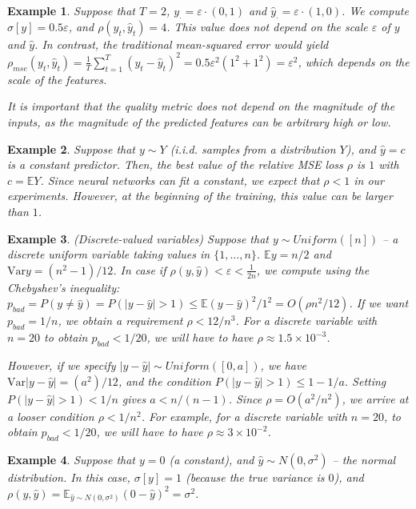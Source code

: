 \documentclass[a4paper,11pt,oneside]{report}
\newtheorem{example}{Example}[section]
\newcommand{\var}{\mbox{Var}}
\begin{document}
\begin{example}
    Suppose that $T=2$, $y_{\cdot}=\varepsilon\cdot (0,1)$ and $\hat{y}_{\cdot}=\varepsilon\cdot (1, 0)$. We compute $\sigma[y]=0.5\varepsilon$, and $\rho(y_t,\hat{y}_t)=4$. This value does not depend on the scale $\varepsilon$ of $y$ and $\hat{y}$. In contrast, the traditional mean-squared error would yield $\rho_{mse}(y_t,\hat{y}_t)=\frac{1}{T}\sum\limits_{t=1}^T\left(y_t-\hat{y}_t\right)^2=0.5\varepsilon^2(1^2+1^2)=\varepsilon^2$, which depends on the scale of the features.

    It is important that the quality metric does not depend on the magnitude of the inputs, as the magnitude of the predicted features can be arbitrary high or low.
\end{example}

\begin{example}
    Suppose that $y\sim Y$ (i.i.d. samples from a distribution $Y$), and $\hat{y}=c$ is a constant predictor. Then, the best value of the relative MSE loss $\rho$ is $1$ with $c=\mathbb EY$. Since neural networks can fit a constant, we expect that $\rho<1$ in our experiments. However, at the beginning of the training, this value can be larger than $1$.
\end{example}

\begin{example}{(Discrete-valued variables)}
    Suppose that $y\sim Uniform([n])$ -- a discrete uniform variable taking values in $\{1,...,n\}$. $\mathbb Ey=n/2$ and $\var y=(n^2-1)/12$. In case if $\rho(y,\hat{y})<\varepsilon<\frac{1}{2n}$, we compute using the Chebyshev's inequality: $p_{bad}=P(y\neq \hat{y})=P(|y-\hat{y}|>1)\leq \mathbb E(y-\hat{y})^2/1^2=O(\rho n^2/12)$. If we want $p_{bad}=1/n$, we obtain a requirement $\rho<12/n^3$. For a discrete variable with $n=20$ to obtain $p_{bad}<1/20$, we will have to have $\rho\approx1.5\times 10^{-3}$.

    However, if we specify $|y-\hat{y}|\sim Uniform([0, a])$, we have $\var |y-\hat{y}|=(a^2)/12$, and the condition $P(|y-\hat{y}|>1)\leq 1-1/a$. Setting $P(|y-\hat{y}|>1)<1/n$ gives $a<n/(n-1)$. Since $\rho=O(a^2/n^2)$, we arrive at a looser condition $\rho< 1/n^2$. For example, for a discrete variable with $n=20$, to obtain $p_{bad}<1/20$, we will have to have $\rho\approx 3\times 10^{-2}$.
\end{example}

\begin{example}
    Suppose that $y=0$ (a constant), and $\hat{y}\sim N(0, \sigma^2)$ -- the normal distribution. In this case, $\sigma[y]=1$ (because the true variance is $0$), and $\rho(y, \hat{y})=\mathbb E_{\hat{y}\sim N(0, \sigma^2)}(0-\hat{y})^2=\sigma^2$.
\end{example}
\end{document}
